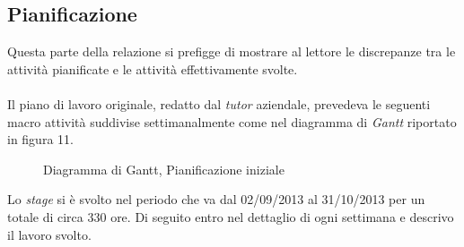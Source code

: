 \subsection{Pianificazione}
\label{3.1}
Questa parte della relazione si prefigge di mostrare al lettore le discrepanze tra le attività pianificate e le attività effettivamente svolte.\\\\
Il piano di lavoro originale, redatto dal \emph{tutor} aziendale, prevedeva le seguenti macro attività suddivise settimanalmente come nel diagramma di \emph{Gantt} riportato in figura 11.
\begin{figure}[H]
\centering
\noindent{}
\caption{Diagramma di Gantt, Pianificazione iniziale}
\end{figure}
Lo \emph{stage} si è svolto nel periodo che va dal 02/09/2013 al 31/10/2013 per un totale di circa 330 ore.
Di seguito entro nel dettaglio di ogni settimana e descrivo il lavoro svolto.
